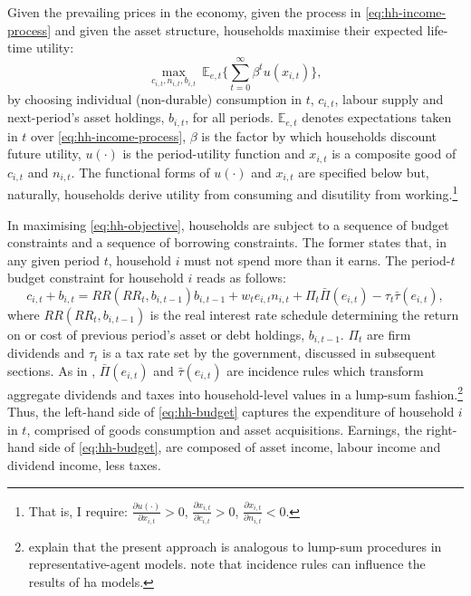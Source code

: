 \documentclass[a4paper,12pt]{article} %
\numberwithin{equation}{section} %
\numberwithin{figure}{section}
\numberwithin{table}{section}
\begin{document}
Given the prevailing prices in the economy, given the process in \eqref{eq:hh-income-process} and given the asset structure, households maximise their expected life-time utility:
\begin{equation}
    \max_{c_{i,t}, n_{i,t}, b_{i,t}} \ \mathbb{E}_{e,t} \Bigg\{ \sum_{t=0}^{\infty} \beta^t u(x_{i,t}) \Bigg\}, \label{eq:hh-objective}
\end{equation}
by choosing individual (non-durable) consumption in $t$, $c_{i,t}$, labour supply and next-period's asset holdings, $b_{i,t}$, for all periods. $\mathbb{E}_{e,t}$ denotes expectations taken in $t$ over \eqref{eq:hh-income-process}, $\beta$ is the factor by which households discount future utility, $u( \cdot )$ is the period-utility function and $x_{i,t}$ is a composite good of $c_{i,t}$ and $n_{i,t}$. The functional forms of $u( \cdot )$ and $x_{i,t}$ are specified below but, naturally, households derive utility from consuming and disutility from working.\footnote{That is, I require: $\frac{\partial u( \cdot )}{\partial x_{i,t}} > 0$, $\frac{\partial x_{i,t}}{\partial c_{i,t}} > 0$, $\frac{\partial x_{i,t}}{\partial n_{i,t}} < 0$.} 

In maximising \eqref{eq:hh-objective}, households are subject to a sequence of budget constraints and a sequence of borrowing constraints. The former states that, in any given period $t$, household $i$ must not spend more than it earns. The period-$t$ budget constraint for household $i$ reads as follows: 
\begin{equation}
c_{i,t} + b_{i,t} = RR (RR_t, b_{i,t-1}) b_{i,t-1} + w_t e_{i,t} n_{i,t} + \Pi_t \bar{\Pi} (e_{i,t}) - \tau_t \bar{\tau} (e_{i,t}), \label{eq:hh-budget}
\end{equation}
where $RR (RR_t, b_{i,t-1})$ is the real interest rate schedule determining the return on or cost of previous period's asset or debt holdings, $b_{i,t-1}$. $\Pi_t$ are firm dividends and $\tau_t$ is a tax rate set by the government, discussed in subsequent sections. As in \textcite{mckay2016}, $\bar{\Pi} (e_{i,t})$ and $\bar{\tau} (e_{i,t})$ are incidence rules which transform aggregate dividends and taxes into household-level values in a lump-sum fashion.\footnote{\textcite{mckay2016} explain that the present approach is analogous to lump-sum procedures in representative-agent models. \textcite{kaplan2018} note that incidence rules can influence the results of \Gls{ha} models.} Thus, the left-hand side of \eqref{eq:hh-budget} captures the expenditure of household $i$ in $t$, comprised of goods consumption and asset acquisitions. Earnings, the right-hand side of \eqref{eq:hh-budget}, are composed of asset income, labour income and dividend income, less taxes.
\end{document}
